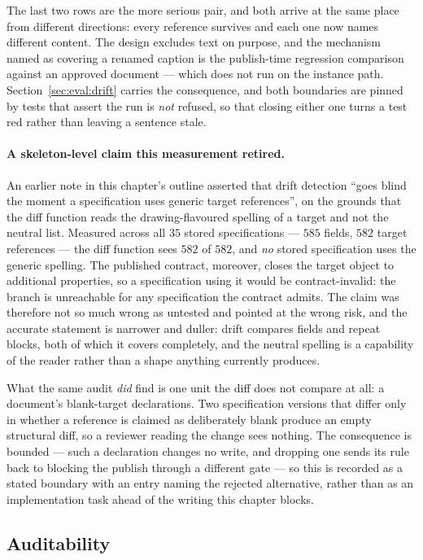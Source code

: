 The last two rows are the more serious pair, and both arrive at the same place from different
directions: every reference survives and each one now names different content. The design
excludes text on purpose, and the mechanism named as covering a renamed caption is the
publish-time regression comparison against an approved document --- which does not run on the
instance path. Section~\ref{sec:eval:drift} carries the consequence, and both boundaries are
pinned by tests that assert the run is \emph{not} refused, so that closing either one turns a
test red rather than leaving a sentence stale.

\paragraph{A skeleton-level claim this measurement retired.}
An earlier note in this chapter's outline asserted that drift detection ``goes blind the moment
a specification uses generic target references'', on the grounds that the diff function reads the
drawing-flavoured spelling of a target and not the neutral list. Measured across all $35$ stored
specifications --- $585$ fields, $582$ target references --- the diff function sees $582$ of $582$,
and \emph{no} stored specification uses the generic spelling. The published contract, moreover,
closes the target object to additional properties, so a specification using it would be
contract-invalid: the branch is unreachable for any specification the contract admits. The claim
was therefore not so much wrong as untested and pointed at the wrong risk, and the accurate
statement is narrower and duller: drift compares fields and repeat blocks, both of which it
covers completely, and the neutral spelling is a capability of the reader rather than a shape
anything currently produces.

What the same audit \emph{did} find is one unit the diff does not compare at all: a document's
blank-target declarations. Two specification versions that differ only in whether a reference is
claimed as deliberately blank produce an empty structural diff, so a reviewer reading the change
sees nothing. The consequence is bounded --- such a declaration changes no write, and dropping
one sends its rule back to blocking the publish through a different gate --- so this is recorded
as a stated boundary with an entry naming the rejected alternative, rather than as an
implementation task ahead of the writing this chapter blocks.

\subsection{Auditability}
\label{sec:design:audit}

